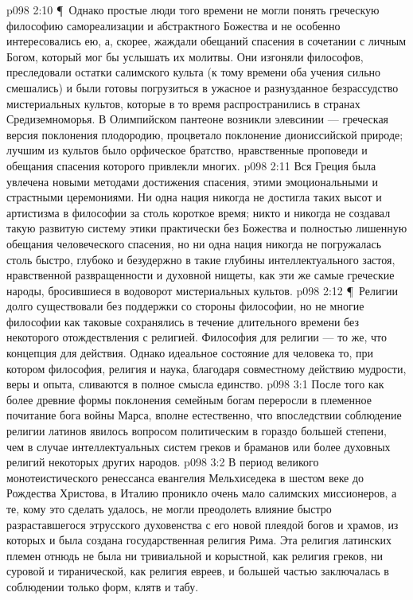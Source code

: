 \vs p098 2:10 \P\ Однако простые люди того времени не могли понять греческую философию самореализации и абстрактного Божества и не особенно интересовались ею, а, скорее, жаждали обещаний спасения в сочетании с личным Богом, который мог бы услышать их молитвы. Они изгоняли философов, преследовали остатки салимского культа (к тому времени оба учения сильно смешались) и были готовы погрузиться в ужасное и разнузданное безрассудство мистериальных культов, которые в то время распространились в странах Средиземноморья. В Олимпийском пантеоне возникли элевсинии --- греческая версия поклонения плодородию, процветало поклонение диониссийской природе; лучшим из культов было орфическое братство, нравственные проповеди и обещания спасения которого привлекли многих.
\vs p098 2:11 Вся Греция была увлечена новыми методами достижения спасения, этими эмоциональными и страстными церемониями. Ни одна нация никогда не достигла таких высот и артистизма в философии за столь короткое время; никто и никогда не создавал такую развитую систему этики практически без Божества и полностью лишенную обещания человеческого спасения, но ни одна нация никогда не погружалась столь быстро, глубоко и безудержно в такие глубины интеллектуального застоя, нравственной развращенности и духовной нищеты, как эти же самые греческие народы, бросившиеся в водоворот мистериальных культов.
\vs p098 2:12 \P\ Религии долго существовали без поддержки со стороны философии, но не многие философии как таковые сохранялись в течение длительного времени без некоторого отождествления с религией. Философия для религии --- то же, что концепция для действия. Однако идеальное состояние для человека то, при котором философия, религия и наука, благодаря совместному действию мудрости, веры и опыта, сливаются в полное смысла единство.
\vs p098 3:1 После того как более древние формы поклонения семейным богам переросли в племенное почитание бога войны Марса, вполне естественно, что впоследствии соблюдение религии латинов явилось вопросом политическим в гораздо большей степени, чем в случае интеллектуальных систем греков и браманов или более духовных религий некоторых других народов.
\vs p098 3:2 В период великого монотеистического ренессанса евангелия Мельхиседека в шестом веке до Рождества Христова, в Италию проникло очень мало салимских миссионеров, а те, кому это сделать удалось, не могли преодолеть влияние быстро разраставшегося этрусского духовенства с его новой плеядой богов и храмов, из которых и была создана государственная религия Рима. Эта религия латинских племен отнюдь не была ни тривиальной и корыстной, как религия греков, ни суровой и тиранической, как религия евреев, и большей частью заключалась в соблюдении только форм, клятв и табу.
